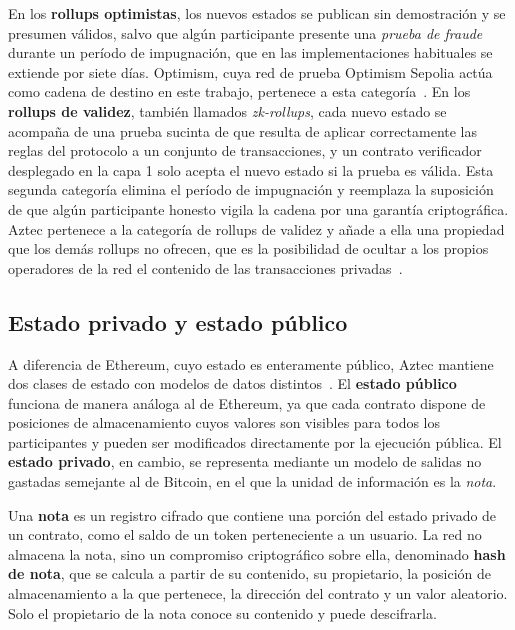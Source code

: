En los \textbf{rollups optimistas}, los nuevos estados se publican sin demostración y se presumen
válidos, salvo que algún participante presente una \textit{prueba de fraude} durante un período
de impugnación, que en las implementaciones habituales se extiende por siete días. Optimism,
cuya red de prueba Optimism Sepolia actúa como cadena de destino en este trabajo, pertenece a esta
categoría~\cite{optimismfaultproofs}. En los \textbf{rollups de validez}, también llamados
\textit{zk-rollups}, cada nuevo estado se acompaña de una prueba sucinta de que resulta de aplicar
correctamente las reglas del protocolo a un conjunto de transacciones, y un contrato verificador
desplegado en la capa 1 solo acepta el nuevo estado si la prueba es válida. Esta segunda
categoría elimina el período de impugnación y reemplaza la suposición de que algún participante
honesto vigila la cadena por una garantía criptográfica. Aztec pertenece a la categoría de
rollups de validez y añade a ella una propiedad que los demás rollups no ofrecen, que es la
posibilidad de ocultar a los propios operadores de la red el contenido de las transacciones
privadas~\cite{aztecdocs}.

\subsection{Estado privado y estado público}
\label{sec:aztec_estado}

A diferencia de Ethereum, cuyo estado es enteramente público, Aztec mantiene dos clases de estado
con modelos de datos distintos~\cite{aztecstate}. El \textbf{estado público} funciona de manera
análoga al de Ethereum, ya que cada contrato dispone de posiciones de almacenamiento cuyos valores
son visibles para todos los participantes y pueden ser modificados directamente por la ejecución
pública. El \textbf{estado privado}, en cambio, se representa mediante un modelo de salidas no
gastadas semejante al de Bitcoin, en el que la unidad de información es la \textit{nota}.

\begin{definition}
	\label{def:nota}
	Una \textbf{nota} es un registro cifrado que contiene una porción del estado privado de un
	contrato, como el saldo de un token perteneciente a un usuario. La red no almacena la nota,
	sino un compromiso criptográfico sobre ella, denominado \textbf{hash de nota}, que se calcula a
	partir de su contenido, su propietario, la posición de almacenamiento a la que pertenece, la
	dirección del contrato y un valor aleatorio. Solo el propietario de la nota conoce su
	contenido y puede descifrarla.
\end{definition}

